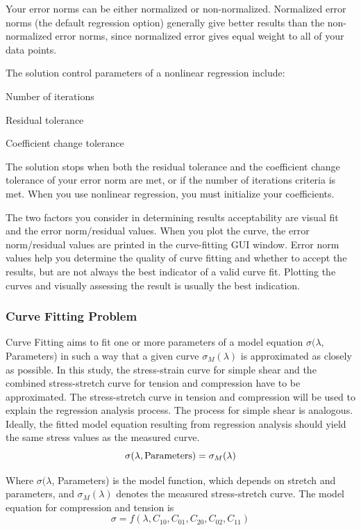  Your error norms can be either normalized or non-normalized. Normalized error norms (the default regression option) generally give better results than the non-normalized error norms, since normalized error gives equal weight to all of your data points.

The solution control parameters of a nonlinear regression include:

    Number of iterations

    Residual tolerance

    Coefficient change tolerance

The solution stops when both the residual tolerance and the coefficient change tolerance of your error norm are met, or if the number of iterations criteria is met. When you use nonlinear regression, you must initialize your coefficients. 

The two factors you consider in determining results acceptability are visual fit and the error norm/residual values. When you plot the curve, the error norm/residual values are printed in the curve-fitting GUI window. Error norm values help you determine the quality of curve fitting and whether to accept the results, but are not always the best indicator of a valid curve fit. Plotting the curves and visually assessing the result is usually the best indication.
\subsubsection{Curve Fitting Problem}
Curve Fitting aims to fit one or more parameters of a model equation $\sigma ( \lambda$, Parameters) in such a way that a given curve $\sigma_M(\lambda)$ is approximated as closely as possible. In this
study, the stress-strain curve for simple shear and the combined stress-stretch curve for
tension and compression have to be approximated. The stress-stretch curve in tension
and compression will be used to explain the regression analysis process. The process for
simple shear is analogous.
Ideally, the fitted model equation resulting from regression analysis should yield the
same stress values as the measured curve.
\begin{equation}
\sigma(\lambda, \textnormal{Parameters})=\sigma_M(\lambda)
\end{equation}

Where $\sigma ( \lambda$, Parameters) is the model function, which depends on stretch and parameters,
and $\sigma_M(\lambda)$ denotes the measured stress-stretch curve.
The model equation for compression and tension is
\begin{equation}
\sigma=f(\lambda, C_{10}, C_{01}, C_{20}, C_{02}, C_{11})
\end{equation}

